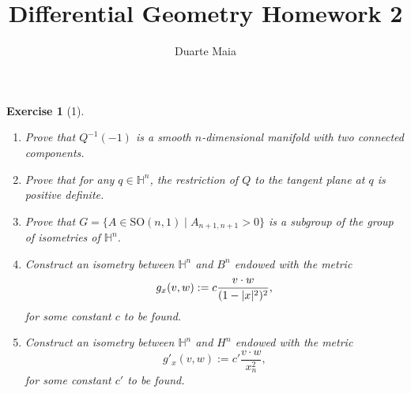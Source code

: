 \documentclass{article}
\title{Differential Geometry Homework 2}
\author{Duarte Maia}
\theoremstyle{plain}
\newtheorem*{ex}{Exercise}
\theoremstyle{nonumberplain}
\newcommand{\HH}{\mathbb{H}}
\newcommand{\SO}{\mathrm{SO}}
\DeclarePairedDelimiter{\norm}{\lvert}{\rvert}
\begin{document}
\maketitle

\begin{ex}[1]
\leavevmode
\begin{enumerate}
\item Prove that $Q^{-1}(-1)$ is a smooth $n$-dimensional manifold with two connected components.
\item Prove that for any $q \in \HH^n$, the restriction of $Q$ to the tangent plane at $q$ is positive definite.
\item Prove that $G = \{A \in \SO(n,1) \mid A_{n+1,n+1} > 0\}$ is a subgroup of the group of isometries of $\HH^n$.
\item Construct an isometry between $\HH^n$ and $B^n$ endowed with the metric
\begin{equation}
g_x (v,w) := c \frac{v \cdot w}{(1- \norm{x}^2)^2},
\end{equation}
for some constant $c$ to be found.
\item Construct an isometry between $\HH^n$ and $H^n$ endowed with the metric
\begin{equation}
g'_x(v,w) := c' \frac{v \cdot w}{x_n^2},
\end{equation}
for some constant $c'$ to be found.
\end{enumerate}
\end{ex}
\end{document}
